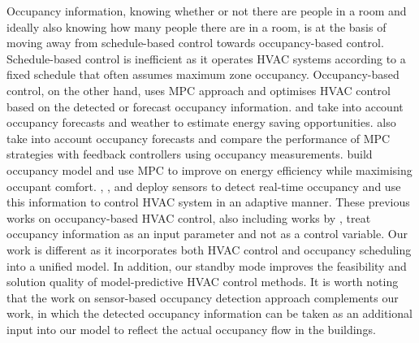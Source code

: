 Occupancy information, knowing whether or not there are people in a room and ideally also knowing how many people there are in a room, is at the basis of moving away from schedule-based control towards occupancy-based control. Schedule-based control is inefficient as it operates HVAC systems according to a fixed schedule that often assumes maximum zone occupancy. Occupancy-based control, on the other hand, uses MPC approach and optimises HVAC control based on the detected or forecast occupancy information. \cite{klein2012coordinating} and \cite{oldewurtel2012use} take into account occupancy forecasts and weather to estimate energy saving opportunities. \cite{goyal2013occupancy} also take into account occupancy forecasts and compare the performance of MPC strategies with feedback controllers using occupancy measurements. \cite{mady2011stochastic} build occupancy model and use MPC to improve on energy efficiency while maximising occupant comfort. \cite{mamidi2012adaptive}, \cite{li2012measuring}, \cite{erickson2009energy} and \cite{agarwal2010occupancy} deploy sensors to detect real-time occupancy and use this information to control HVAC system in an adaptive manner. These previous works on occupancy-based HVAC control, also including works by \cite{brooks2015energy,mady2011stochastic,parisio2013randomized,xu2009model}, treat occupancy information as an input parameter and not as a control variable. Our work is different as it incorporates both HVAC control and occupancy scheduling into a unified model. In addition, our standby mode improves the feasibility and solution quality of model-predictive HVAC control methods. It is worth noting that the work on sensor-based occupancy detection approach complements our work, in which the detected occupancy information can be taken as an additional input into our model to reflect the actual occupancy flow in the buildings. 



